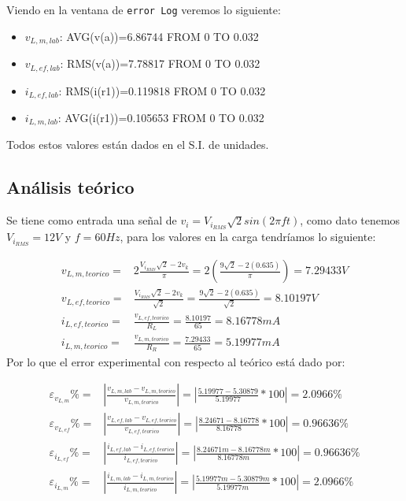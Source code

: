 \documentclass[a4paper]{article} %
\begin{document}
Viendo en la ventana de \texttt{error Log} veremos lo siguiente: 

\begin{itemize}
	\item $v_{L,m,lab}$: AVG(v(a))=6.86744 FROM 0 TO 0.032
	\item $v_{L,ef,lab}$: RMS(v(a))=7.78817 FROM 0 TO 0.032
	\item $i_{L,ef,lab}$: RMS(i(r1))=0.119818 FROM 0 TO 0.032
	\item $i_{L,m,lab}$: AVG(i(r1))=0.105653 FROM 0 TO 0.032
\end{itemize}

Todos estos valores están dados en el S.I. de unidades.

\subsection{Análisis teórico}
Se tiene como entrada una señal de $v_i = V_{i_{RMS}}\sqrt{2}sin(2 \pi f t)$, como dato tenemos $V_{i_{RMS}} = 12V$ y $f=60Hz$, para los valores en la carga tendríamos lo siguiente:

\begin{align}
	v_{L,m, teorico} = & 2\frac{ V_{i_{RMS}}\sqrt{2} - 2v_k}{\pi} = 2 \left(\frac{9\sqrt{2} - 2(0.635)}{\pi}\right) = 7.29433 V \\
	v_{L,ef, teorico} = & \frac{ V_{i_{RMS}}\sqrt{2} - 2v_k}{\sqrt{2}} = \frac{9\sqrt{2} - 2(0.635)}{\sqrt{2}} = 8.10197V \\
	i_{L,ef, teorico} = & \frac{v_ {L,ef, teorico}}{R_L} = \frac{8.10197}{65} = 8.16778 mA \\
	i_{L,m,teorico} = & \frac{v_{L,m, teorico}}{R_R} = \frac{7.29433}{65} = 5.19977mA
\end{align}
Por lo que el error experimental con respecto al teórico está dado por:

\begin{align}
	\varepsilon_{v_{L,m}} \% = & \left|\frac{v_{L,m,lab} - v_{L,m,teorico}}{v_{L,m,teorico}} \right| = \left| \frac{5.19977 - 5.30879}{5.19977} *100 \right|= 2.0966 \% \\
	\varepsilon_{v_{L,ef}} \% = & \left|\frac{v_{L,ef,lab} - v_{L,ef,teorico}}{v_{L,ef,teorico}} \right| = \left| \frac{8.24671 - 8.16778}{8.16778} *100 \right|= 0.96636 \% \\
	\varepsilon_{i_{L,ef}} \% = & \left|\frac{i_{L,ef,lab} - i_{L,ef,teorico}}{i_{L,ef,teorico}} \right| = \left| \frac{8.24671m - 8.16778m}{8.16778m} *100 \right|= 0.96636 \% \\
	\varepsilon_{i_{L,m}} \% = & \left|\frac{i_{L,m,lab} - i_{L,m,teorico}}{i_{L,m,teorico}} \right| = \left| \frac{5.19977m - 5.30879m}{5.19977m} *100 \right|= 2.0966 \%
\end{align}
\end{document}
